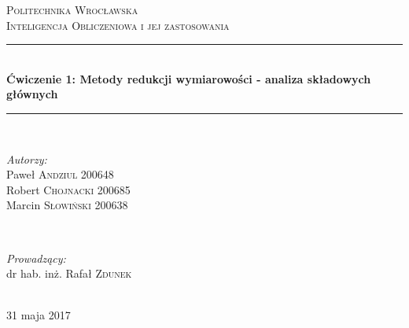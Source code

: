 \begin{titlepage}

\newcommand{\HRule}{\rule{\linewidth}{0.5mm}} 
\center 

\textsc{\LARGE Politechnika Wrocławska}\\[1.5cm] 
\textsc{\Large Inteligencja Obliczeniowa i jej zastosowania}\\[0.5cm] 
\HRule \\[0.5cm]
{ \huge \bfseries Ćwiczenie 1: Metody redukcji wymiarowości - analiza składowych głównych}\\[0.5cm] 
\HRule \\[1.6cm]
 
\begin{minipage}{0.4\textwidth}
\begin{flushleft} \large
\emph{Autorzy:}\\
Paweł  \textsc{Andziul} 200648 \\
Robert  \textsc{Chojnacki} 200685 \\
Marcin  \textsc{Słowiński} 200638 \\
\end{flushleft}
\end{minipage}
~
\begin{minipage}{0.4\textwidth}
\begin{flushright} \large
\emph{Prowadzący:} \\
dr hab. inż. Rafał \textsc{Zdunek}
\end{flushright}
\end{minipage}\\[4cm]

\vfill 
{\large 31 maja 2017}\\[3cm] 

\end{titlepage}